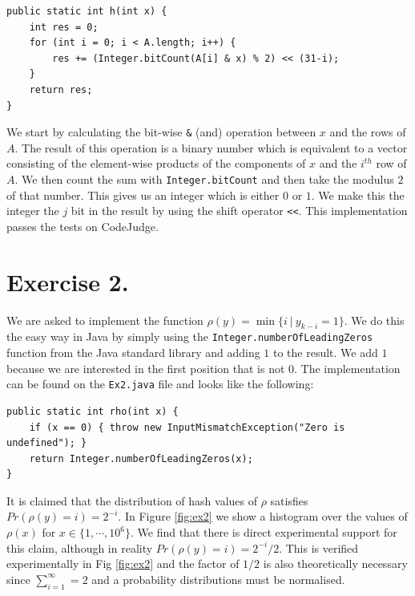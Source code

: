 \documentclass{tufte-handout}
\begin{document}
\begin{lstlisting}
public static int h(int x) {
    int res = 0;
    for (int i = 0; i < A.length; i++) {
        res += (Integer.bitCount(A[i] & x) % 2) << (31-i);
    }
    return res;
}
\end{lstlisting}
\noindent We start by calculating the bit-wise {\tt \&} (and) operation between $x$ and the rows of $A$. The result of this operation is a binary number which is equivalent to a vector consisting of the element-wise products of the components of $x$ and the $i^{th}$ row of $A$. We then count the sum with {\tt Integer.bitCount} and then take the modulus $2$ of that number. This gives us an integer which is either $0$ or $1$. We make this the integer the $j$ bit in the result by using the shift operator {\tt <<}. This implementation passes the tests on CodeJudge.

\section{\textbf{Exercise 2.}}

We are asked to implement the function $\rho(y) = \min\{i\ |\ y_{k-i}=1\}$. We do this the easy way in Java by simply using the {\tt Integer.numberOfLeadingZeros} function from the Java standard library and adding $1$ to the result. We add $1$ because we are interested in the first position that is not $0$. The implementation can be found on the {\tt Ex2.java} file and looks like the following:

\begin{lstlisting}
public static int rho(int x) {
    if (x == 0) { throw new InputMismatchException("Zero is undefined"); }
    return Integer.numberOfLeadingZeros(x);
}
\end{lstlisting}
\noindent
It is claimed that the distribution of hash values of $\rho$ satisfies $Pr(\rho(y)=i) = 2^{-i}$.
In Figure \ref{fig:ex2} we show a histogram over the values of $\rho(x)$ for $x \in \{1,\cdots,10^6\}$. We find that there is direct experimental support for this claim, although in reality $Pr(\rho(y)=i)=2^{-i}/2$. This is verified experimentally in Fig \ref{fig:ex2} and the factor of $1/2$ is also theoretically necessary since $\sum_{i=1}^{\infty} = 2$ and a probability distributions must be normalised.
\end{document}
